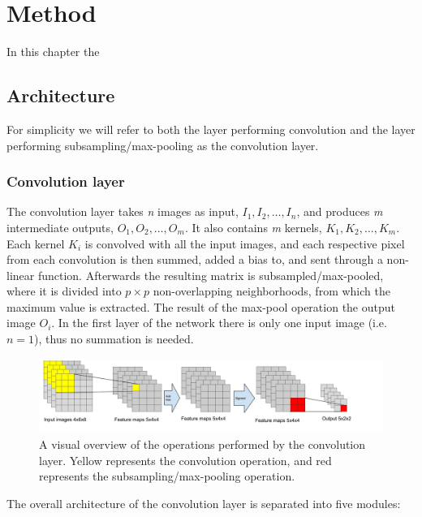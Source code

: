 \chapter{Method}

In this chapter the 
\section{Architecture}


For simplicity we will refer to both the layer performing convolution and the layer performing subsampling/max-pooling as the convolution layer. 

\subsection {Convolution layer}

The convolution layer takes \textit{n} images as input, $ I_1, I_2, \dots, I_n $, and produces \textit{m} intermediate outputs, $O_1, O_2, \dots, O_m $. It also contains \textit{m} kernels, $ K_1, K_2, \dots, K_m $. Each kernel $ K_i $ is convolved with all the input images, and each respective pixel from each convolution is then summed, added a bias to, and sent through a non-linear function. Afterwards the resulting matrix is subsampled/max-pooled, where it is divided into $ p \times p $ non-overlapping neighborhoods, from which the maximum value is extracted. The result of the max-pool operation the output image $ O_i $. 
In the first layer of the network there is only one input image (i.e. $ n = 1 $), thus no summation is needed. 


\begin{figure}[h!]
  \centering
      \includegraphics[width=1.0\textwidth]{Figures/Method/Convolution_subsample_pool}
  \caption{A visual overview of the operations performed by the convolution layer. Yellow represents the convolution operation, and red represents the subsampling/max-pooling operation.}
\end{figure}



The overall architecture of the convolution layer is separated into five modules:

